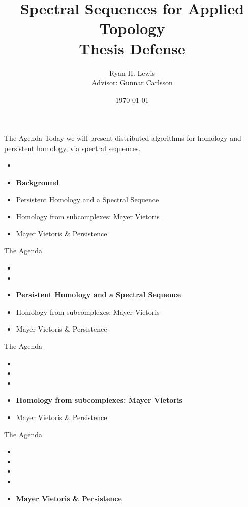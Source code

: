 \documentclass{beamer}
\title{Spectral Sequences for Applied Topology \\ Thesis Defense}
\author{Ryan H. Lewis \vspace{.5cm} \\ Advisor:  Gunnar Carlsson}
\date{\today}
\begin{document}
\frame{\titlepage}

\begin{frame}{The Agenda}
Today we will present distributed algorithms for homology and persistent homology, via spectral sequences. 
\begin{itemize}
\item {\color{gray}{Motivation}}
\item \textbf{Background}
\item Persistent Homology and a Spectral Sequence
\item Homology from subcomplexes: Mayer Vietoris 
\item Mayer Vietoris \& Persistence
\end{itemize}
\end{frame}

\begin{frame}{The Agenda}
\begin{itemize}
\item {\color{gray}{Motivation}}
\item {\color{gray}{Background}}
\item \textbf{Persistent Homology and a Spectral Sequence}
\item Homology from subcomplexes: Mayer Vietoris 
\item Mayer Vietoris \& Persistence
\end{itemize}
\end{frame}

\begin{frame}{The Agenda}
\begin{itemize}
\item {\color{gray}{Motivation}}
\item {\color{gray}{Background}}
\item {\color{gray}{Persistent Homology and a Spectral Sequence}}
\item \textbf{Homology from subcomplexes: Mayer Vietoris}
\item Mayer Vietoris \& Persistence
\end{itemize}
\end{frame}

\begin{frame}{The Agenda}
\begin{itemize}
\item {\color{gray}{Motivation}}
\item {\color{gray}{Background}}
\item {\color{gray}{Persistent Homology and a Spectral Sequence}}
\item {\color{gray}{Homology from subcomplexes: Mayer Vietoris }}
\item \textbf{Mayer Vietoris \& Persistence}
\end{itemize}
\end{frame}
\end{document}
